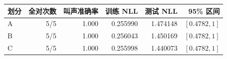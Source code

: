 \begin{center}\begin{tabular}{lrrrrr}\toprule
划分 & 全对次数 & 叫声准确率 & 训练 NLL & 测试 NLL & 95\% 区间\\\midrule
A & 5/5 & 1.000 & 0.255990 & 1.474148 & $[0.4782,1]$ \\
B & 5/5 & 1.000 & 0.256043 & 1.450169 & $[0.4782,1]$ \\
C & 5/5 & 1.000 & 0.255998 & 1.440073 & $[0.4782,1]$ \\
\bottomrule\end{tabular}\end{center}
